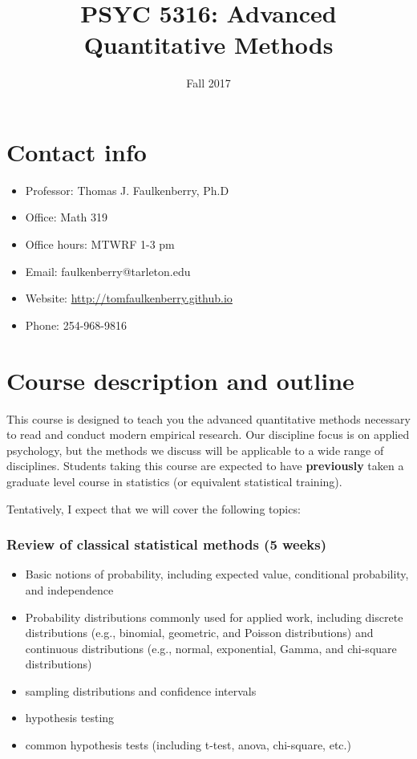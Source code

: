 \documentclass[10pt]{article}
\date{Fall 2017}
\title{PSYC 5316: Advanced Quantitative Methods}
\begin{document}
\maketitle

\section*{Contact info}
\label{sec-1}
\begin{itemize}
\item Professor: Thomas J. Faulkenberry, Ph.D
\item Office: Math 319
\item Office hours: MTWRF 1-3 pm
\item Email: faulkenberry@tarleton.edu
\item Website: \url{http://tomfaulkenberry.github.io}
\item Phone: 254-968-9816
\end{itemize}

\section*{Course description and outline}
\label{sec-2}

This course is designed to teach you the advanced quantitative methods necessary to read and conduct modern empirical research.  Our discipline focus is on applied psychology, but the methods we discuss will be applicable to a wide range of disciplines.  Students taking this course are expected to have \textbf{previously} taken a graduate level course in statistics (or equivalent statistical training).  

Tentatively, I expect that we will cover the following topics:

\subsubsection*{Review of classical statistical methods (5 weeks)}
\label{sec-2-0-1}
\begin{itemize}
\item Basic notions of probability, including expected value, conditional probability, and independence
\item Probability distributions commonly used for applied work, including discrete distributions (e.g., binomial, geometric, and Poisson distributions) and continuous distributions (e.g., normal, exponential, Gamma, and chi-square distributions)
\item sampling distributions and confidence intervals
\item hypothesis testing
\item common hypothesis tests (including t-test, anova, chi-square, etc.)
\end{itemize}
\end{document}
